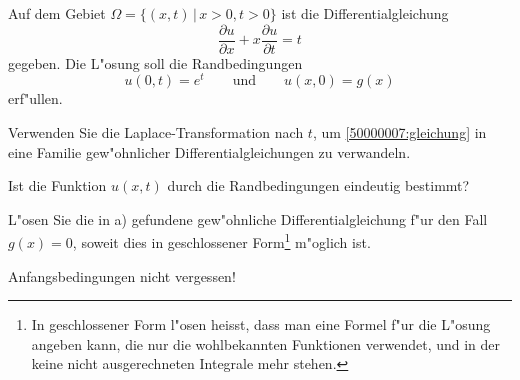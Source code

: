 Auf dem Gebiet $\Omega=\{(x,t)\,|\, x>0,t > 0\}$
ist die Differentialgleichung
\begin{equation}
\frac{\partial u}{\partial x}+x\frac{\partial u}{\partial t}=t
\label{50000007:gleichung}
\end{equation}
gegeben. Die L"osung soll die Randbedingungen
\[
u(0,t)=e^t
\qquad
\text{und}
\qquad
u(x,0)=g(x)
\]
erf"ullen.
\begin{teilaufgaben}
\item Verwenden Sie die Laplace-Transformation nach $t$,
um \eqref{50000007:gleichung} in eine Familie gew"ohnlicher
Differentialgleichungen zu verwandeln.
\item
Ist die Funktion $u(x,t)$ durch die Randbedingungen eindeutig bestimmt?
\item
L"osen Sie die in a) gefundene gew"ohnliche Differentialgleichung f"ur den Fall
$g(x)=0$, soweit dies in geschlossener Form\footnote{In geschlossener Form
l"osen heisst, dass man eine Formel f"ur die L"osung angeben kann, die 
nur die wohlbekannten Funktionen verwendet, und in der keine nicht
ausgerechneten Integrale mehr stehen.
} m"oglich ist.
\end{teilaufgaben}

\begin{hinweis}
Anfangsbedingungen nicht vergessen!
\end{hinweis}


